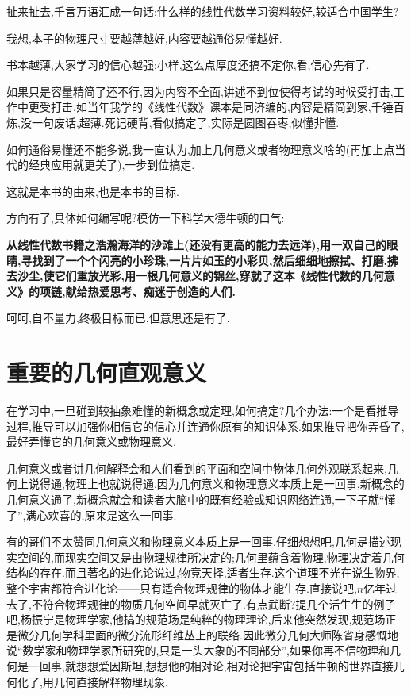 扯来扯去,千言万语汇成一句话:什么样的线性代数学习资料较好,较适合中国学生?

我想,本子的物理尺寸要越薄越好,内容要越通俗易懂越好.

书本越薄,大家学习的信心越强:小样,这么点厚度还搞不定你,看,信心先有了.

如果只是容量精简了还不行,因为内容不全面,讲述不到位使得考试的时候受打击,工作中更受打击.如当年我学的《线性代数》课本是同济编的,内容是精简到家,千锤百炼,没一句废话,超薄.死记硬背,看似搞定了,实际是圆图吞枣,似懂非懂.

如何通俗易懂还不能多说,我一直认为,加上几何意义或者物理意义啥的(再加上点当代的经典应用就更美了),一步到位搞定.

这就是本书的由来,也是本书的目标.

方向有了,具体如何编写呢?模仿一下科学大德牛顿的口气:

\textbf{从线性代数书籍之浩瀚海洋的沙滩上(还没有更高的能力去远洋),用一双自己的眼睛,寻找到了一个个闪亮的小珍珠,一片片如玉的小彩贝,然后细细地擦拭、打磨,拂去沙尘,使它们重放光彩,用一根几何意义的锦丝,穿就了这本《线性代数的几何意义》的项链,献给热爱思考、痴迷于创造的人们.}

呵呵,自不量力,终极目标而已,但意思还是有了.

\section{重要的几何直观意义}

在学习中,一旦碰到较抽象难懂的新概念或定理,如何搞定?几个办法:一个是看推导过程,推导可以加强你相信它的信心并连通你原有的知识体系.如果推导把你弄昏了,最好弄懂它的几何意义或物理意义.

几何意义或者讲几何解释会和人们看到的平面和空间中物体几何外观联系起来,几何上说得通,物理上也就说得通,因为几何意义和物理意义本质上是一回事,新概念的几何意义通了,新概念就会和读者大脑中的既有经验或知识网络连通,一下子就``懂了'',满心欢喜的,原来是这么一回事.

有的哥们不太赞同几何意义和物理意义本质上是一回事.仔细想想吧,几何是描述现实空间的,而现实空间又是由物理规律所决定的;几何里蕴含着物理,物理决定着几何结构的存在.而且著名的进化论说过,物竞天择,适者生存.这个道理不光在说生物界,整个宇宙都符合进化论——只有适合物理规律的物体才能生存.直接说吧,$n$亿年过去了,不符合物理规律的物质几何空间早就灭亡了.有点武断?提几个活生生的例子吧,杨振宁是物理学家,他搞的规范场是纯粹的物理理论,后来他突然发现,规范场正是微分几何学科里面的微分流形纤维丛上的联络.因此微分几何大师陈省身感慨地说``数学家和物理学家所研究的,只是一头大象的不同部分'',如果你再不信物理和几何是一回事,就想想爱因斯坦,想想他的相对论,相对论把宇宙包括牛顿的世界直接几何化了,用几何直接解释物理现象.


